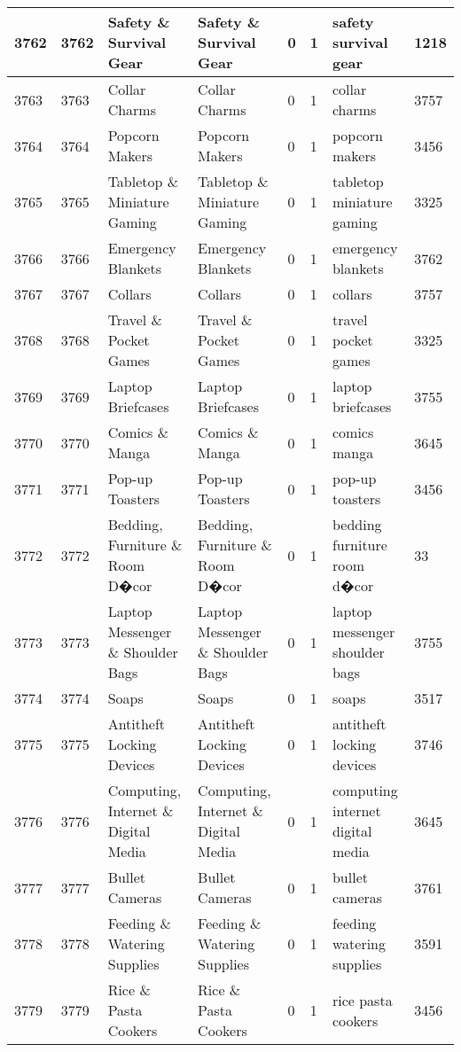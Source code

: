 \begin{longtable}{|l|l|l|l|l|l|l|l|}
3762 & 3762 & Safety \& Survival Gear & Safety \& Survival Gear & 0 & 1 & safety survival gear & 1218 \\ \hline 
3763 & 3763 & Collar Charms & Collar Charms & 0 & 1 & collar charms & 3757 \\ \hline 
3764 & 3764 & Popcorn Makers & Popcorn Makers & 0 & 1 & popcorn makers & 3456 \\ \hline 
3765 & 3765 & Tabletop \& Miniature Gaming & Tabletop \& Miniature Gaming & 0 & 1 & tabletop miniature gaming & 3325 \\ \hline 
3766 & 3766 & Emergency Blankets & Emergency Blankets & 0 & 1 & emergency blankets & 3762 \\ \hline 
3767 & 3767 & Collars & Collars & 0 & 1 & collars & 3757 \\ \hline 
3768 & 3768 & Travel \& Pocket Games & Travel \& Pocket Games & 0 & 1 & travel pocket games & 3325 \\ \hline 
3769 & 3769 & Laptop Briefcases & Laptop Briefcases & 0 & 1 & laptop briefcases & 3755 \\ \hline 
3770 & 3770 & Comics \& Manga & Comics \& Manga & 0 & 1 & comics manga & 3645 \\ \hline 
3771 & 3771 & Pop-up Toasters & Pop-up Toasters & 0 & 1 & pop-up toasters & 3456 \\ \hline 
3772 & 3772 & Bedding, Furniture \& Room D�cor & Bedding, Furniture \& Room D�cor & 0 & 1 & bedding furniture room d�cor & 33 \\ \hline 
3773 & 3773 & Laptop Messenger \& Shoulder Bags & Laptop Messenger \& Shoulder Bags & 0 & 1 & laptop messenger shoulder bags & 3755 \\ \hline 
3774 & 3774 & Soaps & Soaps & 0 & 1 & soaps & 3517 \\ \hline 
3775 & 3775 & Antitheft Locking Devices & Antitheft Locking Devices & 0 & 1 & antitheft locking devices & 3746 \\ \hline 
3776 & 3776 & Computing, Internet \& Digital Media & Computing, Internet \& Digital Media & 0 & 1 & computing internet digital media & 3645 \\ \hline 
3777 & 3777 & Bullet Cameras & Bullet Cameras & 0 & 1 & bullet cameras & 3761 \\ \hline 
3778 & 3778 & Feeding \& Watering Supplies & Feeding \& Watering Supplies & 0 & 1 & feeding watering supplies & 3591 \\ \hline 
3779 & 3779 & Rice \& Pasta Cookers & Rice \& Pasta Cookers & 0 & 1 & rice pasta cookers & 3456 \\ \hline 

\end{longtable}

